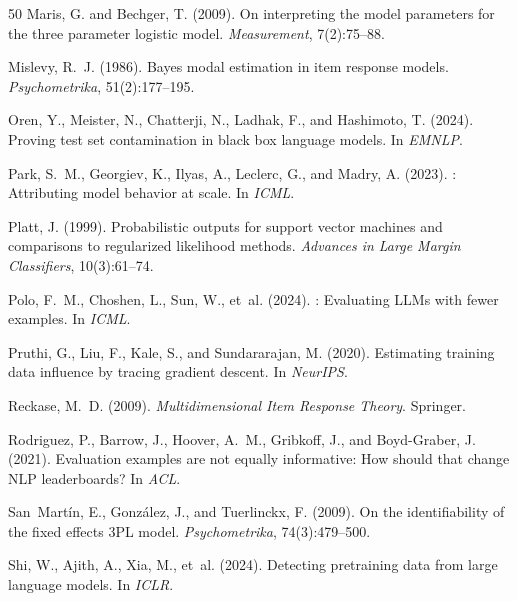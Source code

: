 \documentclass[11pt,a4paper]{article}
\begin{document}
\begin{thebibliography}{50}
Maris, G. and Bechger, T. (2009).
\newblock On interpreting the model parameters for the three parameter logistic model.
\newblock \emph{Measurement}, 7(2):75--88.

Mislevy, R.~J. (1986).
\newblock Bayes modal estimation in item response models.
\newblock \emph{Psychometrika}, 51(2):177--195.

Oren, Y., Meister, N., Chatterji, N., Ladhak, F., and Hashimoto, T. (2024).
\newblock Proving test set contamination in black box language models.
\newblock In \emph{EMNLP}.

Park, S.~M., Georgiev, K., Ilyas, A., Leclerc, G., and Madry, A. (2023).
: Attributing model behavior at scale.
\newblock In \emph{ICML}.

Platt, J. (1999).
\newblock Probabilistic outputs for support vector machines and comparisons to regularized likelihood methods.
\newblock \emph{Advances in Large Margin Classifiers}, 10(3):61--74.

Polo, F.~M., Choshen, L., Sun, W., et~al. (2024).
: Evaluating {LLM}s with fewer examples.
\newblock In \emph{ICML}.

Pruthi, G., Liu, F., Kale, S., and Sundararajan, M. (2020).
\newblock Estimating training data influence by tracing gradient descent.
\newblock In \emph{NeurIPS}.

Reckase, M.~D. (2009).
\newblock \emph{Multidimensional Item Response Theory}.
\newblock Springer.

Rodriguez, P., Barrow, J., Hoover, A.~M., Gribkoff, J., and Boyd-Graber, J. (2021).
\newblock Evaluation examples are not equally informative: How should that change {NLP} leaderboards?
\newblock In \emph{ACL}.

San~Mart\'in, E., Gonz\'alez, J., and Tuerlinckx, F. (2009).
\newblock On the identifiability of the fixed effects 3PL model.
\newblock \emph{Psychometrika}, 74(3):479--500.

Shi, W., Ajith, A., Xia, M., et~al. (2024).
\newblock Detecting pretraining data from large language models.
\newblock In \emph{ICLR}.


\end{thebibliography}
\end{document}
